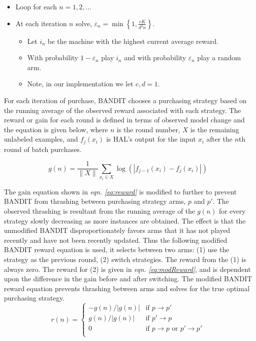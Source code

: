 \documentclass[ms]{nuthesis}
\begin{document}
\begin{itemize}
\item Loop for each $n=1,2,\ldots$
\item At each iteration $n$ solve, $\varepsilon_n= \min \left \{1,\frac{cK}{d^{2}n}  \right \}$.
 \begin{itemize}
      \item{Let $i_n$ be the machine with the highest current average reward.}
      \item{With probability $1-\varepsilon_n$ play $i_n$ and
      with probability $\varepsilon_n$ play a random arm.}
      \item{Note, in our implementation we let $c,d=1$.}
    \end{itemize}
\end{itemize}


For each iteration of purchase, BANDIT chooses a purchasing strategy
based on the running average of the observed reward associated with
each strategy. The reward or gain for each round is defined in terms of
observed model change and the equation is given below, where %
$n$ is the round number,
$X$ is the remaining unlabeled examples, and $f_{j}(x_i)$ is HAL's output for the
input $x_i$ after the $n$th round of batch purchases.

\begin{equation}
\label{eq:reward}
g(n) = \frac{1}{\|X\|}\sum_{x_i \in X} \log{(|f_{j-1}(x_i) - f_{j}(x_i)|)}
\end{equation}

The gain equation shown in \textit{eqn. \ref{eq:reward}} is modified to further
to prevent BANDIT from thrashing between purchasing strategy arms, $p$ and $p'$.
The observed thrashing is resultant from the running average of the $g(n)$
for every strategy slowly decreasing as more instances are obtained. The effect is
 that the unmodified BANDIT disproportionately favors arms that it has not played
  recently and have not been recently updated.
  Thus the following modified
  BANDIT reward equation is used, it selects between two arms: (1) use the
  strategy as the previous round, (2) switch strategies. The reward from the
  (1) is always zero. The reward for (2) is given in
  \textit{eqn. \ref{eq:modReward}}, and is dependent upon the difference
  in the gain before and after switching.
  The modified BANDIT reward
  equation prevents thrashing between arms and solves for the true optimal
  purchasing strategy.
\begin{equation}
\label{eq:modReward}
    r(n)=
\begin{cases}
   -g(n)/|g(n)| & \text{if } p \rightarrow p'\\
    g(n)/|g(n)| & \text{if } p' \rightarrow p\\
    0 & \text{if }  p \rightarrow  p \text{ or }  p' \rightarrow p' \\
\end{cases}
\end{equation}
\end{document}
